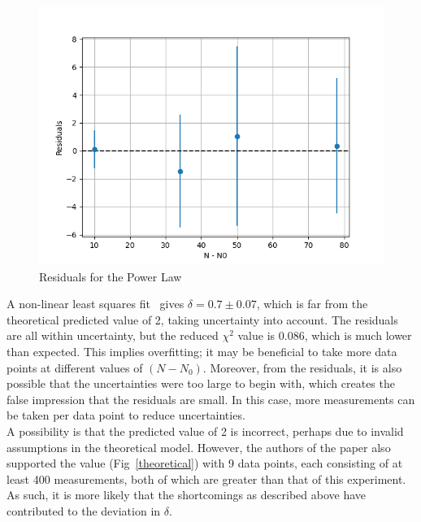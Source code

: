 \documentclass[12pt]{IEEEtran}
\begin{document}
\begin{figure}[h]
    \centering
    \includegraphics[scale=0.5]{part1_res.png}
    \caption{Residuals for the Power Law}
\end{figure}

A non-linear least squares fit~\cite{curvefit} gives $\delta = 0.7 \pm 0.07$, which is far from the theoretical predicted value of 2, taking uncertainty into account. The residuals are all within uncertainty, but the reduced $\chi^2$ value is $0.086$, which is much lower than expected. This implies overfitting; it may be beneficial to take more data points at different values of $(N - N_0)$. Moreover, from the residuals, it is also possible that the uncertainties were too large to begin with, which creates the false impression that the residuals are small. In this case, more measurements can be taken per data point to reduce uncertainties. \\
A possibility is that the predicted value of 2 is incorrect, perhaps due to invalid assumptions in the theoretical model. However, the authors of the paper also supported the value (Fig~\ref{theoretical}) with 9 data points, each consisting of at least 400 measurements, both of which are greater than that of this experiment. As such, it is more likely that the shortcomings as described above have contributed to the deviation in $\delta$.
\end{document}
